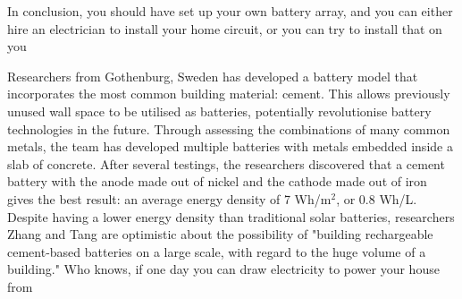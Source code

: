 \begin{multicols}{3}
In conclusion, you should have set up your own battery array, and you can either hire an electrician to install your home circuit, or you can try to install that on you  
\closearticle


Researchers from Gothenburg, Sweden has developed a battery model that incorporates the most common building material: cement. This allows previously unused wall space to be utilised as batteries, potentially revolutionise battery technologies in the future. Through assessing the combinations of many common metals, the team has developed multiple batteries with metals embedded inside a slab of concrete. After several testings, the researchers discovered that a cement battery with the anode made out of nickel and the cathode made out of iron gives the best result: an average energy density of 7 Wh/m$^{2}$, or 0.8 Wh/L. Despite having a lower energy density than traditional solar batteries, researchers Zhang and Tang are optimistic about the possibility of "building rechargeable cement-based batteries on a large scale, with regard to the huge volume of a building." Who knows, if one day you can draw electricity to power your house from 

\closearticle

\end{multicols}
\restoregeometry